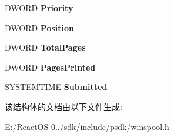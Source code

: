 \begin{DoxyCompactItemize}
\mbox{\label{struct___j_o_b___i_n_f_o__1_a_a9215b0ec2147dcaaea5857cf7e9c34e3}} 
D\+W\+O\+RD {\bfseries Priority}
\item 
\mbox{\label{struct___j_o_b___i_n_f_o__1_a_a9db2bdbcd2dee3658ccf5620b916301b}} 
D\+W\+O\+RD {\bfseries Position}
\item 
\mbox{\label{struct___j_o_b___i_n_f_o__1_a_af2b76f9fcc4f90ce00396eabb06aae11}} 
D\+W\+O\+RD {\bfseries Total\+Pages}
\item 
\mbox{\label{struct___j_o_b___i_n_f_o__1_a_a3197ce228ace7e40254e00b38360a796}} 
D\+W\+O\+RD {\bfseries Pages\+Printed}
\item 
\mbox{\label{struct___j_o_b___i_n_f_o__1_a_a0866ce21185350e31b593e198f48259d}} 
\hyperlink{struct___s_y_s_t_e_m_t_i_m_e}{S\+Y\+S\+T\+E\+M\+T\+I\+ME} {\bfseries Submitted}
\end{DoxyCompactItemize}


该结构体的文档由以下文件生成\+:\begin{DoxyCompactItemize}
\item 
E\+:/\+React\+O\+S-\/0../sdk/include/psdk/winspool.\+h\end{DoxyCompactItemize}

